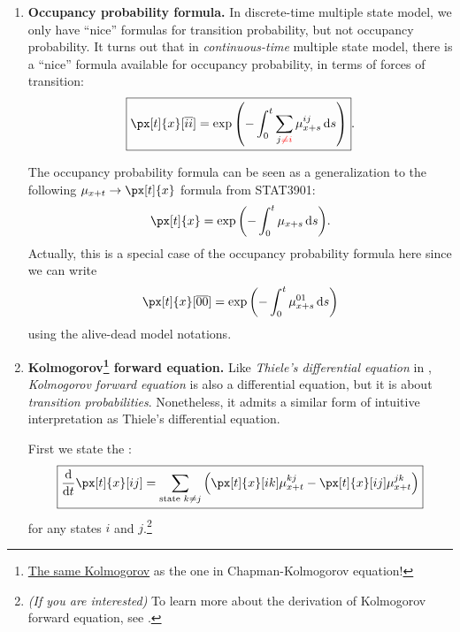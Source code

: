 \begin{enumerate}
\item \label{it:occup-fmla} \textbf{Occupancy probability formula.} In
discrete-time multiple state model, we only have ``nice'' formulas for
transition probability, but not occupancy probability. It turns out that in
\emph{continuous-time} multiple state model, there is a ``nice'' formula
available for occupancy probability, in terms of forces of transition:
\[
\boxed{\px[t]{x}[\overline{ii}]=\exp\qty(-\int_{0}^{t}\sum_{j\rc{\ne i}}^{}\mu_{x+s}^{ij}\dd{s})}.
\]

The occupancy probability formula can be seen as a generalization to the
following \(\mu_{x+t}\to \px[t]{x}\) formula from STAT3901:
\[
\px[t]{x}=\exp\qty(-\int_{0}^{t}\mu_{x+s}\dd{s}).
\]
Actually, this is a special case of the occupancy probability formula here
since we can write
\[
\px[t]{x}[\overline{00}]=\exp\qty(-\int_{0}^{t}\mu_{x+s}^{01}\dd{s})
\]
using the alive-dead model notations.
\item \label{it:kolmogorov-fwd-eq}
\textbf{Kolmogorov\footnote{\href{https://en.wikipedia.org/wiki/Andrey_Kolmogorov}{The
same Kolmogorov} as the one in Chapman-Kolmogorov equation!} forward equation.}
Like \emph{Thiele's differential equation} in
, \emph{Kolmogorov forward equation} is
also a differential equation, but it is about \emph{transition probabilities}.
Nonetheless, it admits a similar form of intuitive interpretation as Thiele's
differential equation.

First we state the :
\[
\boxed{\dv{}{t}\px[t]{x}[ij]=\sum_{\text{state }k\ne j}^{}\qty(\px[t]{x}[ik]\mu_{x+t}^{kj}-\px[t]{x}[ij]\mu_{x+t}^{jk})}
\]
for any states \(i\) and \(j\).\footnote{\emph{(If you are interested)} To
learn more about the derivation of Kolmogorov forward equation, see
\textcite{dickson2019actuarial}.}


\end{enumerate}
